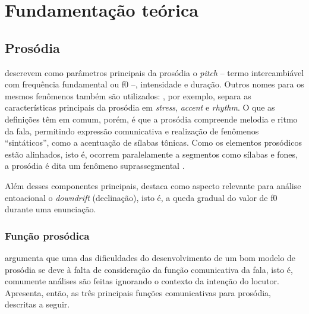 
\chapter{Fundamentação teórica}

\section{Prosódia}
 descrevem como parâmetros principais da prosódia o
\emph{pitch} -- termo intercambiável com frequência fundamental ou f0 --,
intensidade e duração. Outros nomes para os mesmos fenômenos também são
utilizados: , por exemplo, separa as características
principais da prosódia em \emph{stress}, \emph{accent} e \emph{rhythm}. O que as
definições têm em comum, porém, é que a prosódia compreende melodia e ritmo da
fala, permitindo expressão comunicativa e realização de fenômenos
``sintáticos'', como a acentuação de sílabas tônicas. Como os elementos
prosódicos estão alinhados, isto é, ocorrem paralelamente a segmentos como
sílabas e fones, a prosódia é dita um fenômeno suprassegmental \cite{ladd}.

Além desses componentes principais, 
destaca como aspecto relevante para análise entoacional o \emph{downdrift}
(declinação), isto é, a queda gradual do valor de f0 durante uma enunciação.


\subsection{Função prosódica}
 argumenta que uma das dificuldades do desenvolvimento de
um bom modelo de prosódia se deve à falta de consideração da função comunicativa
da fala, isto é, comumente análises são feitas ignorando o contexto da intenção
do locutor. Apresenta, então, as três principais funções comunicativas para
prosódia, descritas a seguir.

